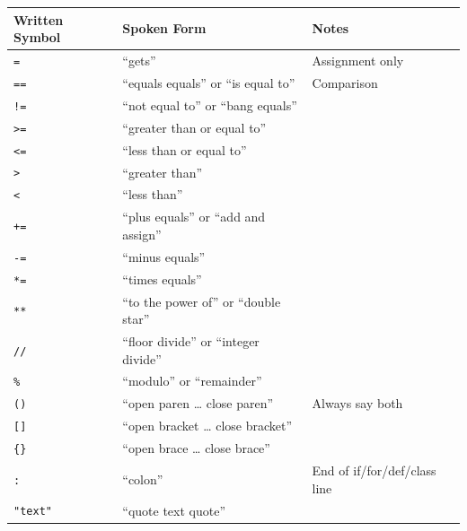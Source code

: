 \documentclass[
  justified,
  openright,
]{tufte-book}
\begin{document}
\begin{fullwidth}{\def\LTcaptype{none} %
\begin{longtable}[]{@{}
  >{\raggedright\arraybackslash}p{}
  >{\raggedright\arraybackslash}p{}
  >{\raggedright\arraybackslash}p{}@{}}
\toprule\noalign{}
\begin{minipage}[b]{\linewidth}\raggedright
Written Symbol
\end{minipage} & \begin{minipage}[b]{\linewidth}\raggedright
Spoken Form
\end{minipage} & \begin{minipage}[b]{\linewidth}\raggedright
Notes
\end{minipage} \\
\midrule\noalign{}
\endhead
\bottomrule\noalign{}
\endlastfoot
\texttt{=} & ``gets'' & Assignment only \\
\texttt{==} & ``equals equals'' or ``is equal to'' & Comparison \\
\texttt{!=} & ``not equal to'' or ``bang equals'' & \\
\texttt{\textgreater{}=} & ``greater than or equal to'' & \\
\texttt{\textless{}=} & ``less than or equal to'' & \\
\texttt{\textgreater{}} & ``greater than'' & \\
\texttt{\textless{}} & ``less than'' & \\
\texttt{+=} & ``plus equals'' or ``add and assign'' & \\
\texttt{-=} & ``minus equals'' & \\
\texttt{*=} & ``times equals'' & \\
\texttt{**} & ``to the power of'' or ``double star'' & \\
\texttt{//} & ``floor divide'' or ``integer divide'' & \\
\texttt{\%} & ``modulo'' or ``remainder'' & \\
\texttt{()} & ``open paren \ldots{} close paren'' & Always say both \\
\texttt{{[}{]}} & ``open bracket \ldots{} close bracket'' & \\
\texttt{\{\}} & ``open brace \ldots{} close brace'' & \\
\texttt{:} & ``colon'' & End of if/for/def/class line \\
\texttt{"text"} & ``quote text quote'' & \\

\end{longtable}}
\end{fullwidth}
\end{document}

